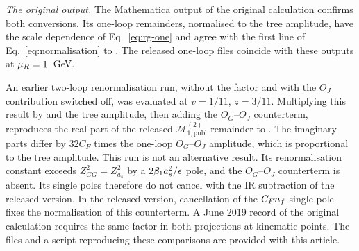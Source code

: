 \emph{The original output.}
The Mathematica output of the original calculation confirms both
conversions.
Its one-loop remainders, normalised to the tree amplitude, have the
scale dependence of Eq.~\eqref{eq:rg-one} and agree with the first
line of Eq.~\eqref{eq:normalisation} to \ArchiveOneLoopDev{}.
The released one-loop files coincide with these outputs at
$\mu_R=1$~GeV.

An earlier two-loop renormalisation run, without the factor
\FileFactor{} and with the $O_J$ contribution switched off,
was evaluated at $v=1/11$, $z=3/11$.
Multiplying this result by \FileFactor{} and the tree amplitude,
then adding the $O_G$--$O_J$ counterterm, reproduces the real part
of the released $\mathcal M_{1,\mathrm{publ}}^{(2)}$ remainder to \ArchiveTwoLoopDev{}.
The imaginary parts differ by $32C_F$ times the one-loop
$O_G$--$O_J$ amplitude, which is proportional to the tree amplitude. This run is not an alternative result.
Its renormalisation constant exceeds $Z_{GG}^2=Z_{a_s}^2$ by a
$2\beta_1a_s^2/\epsilon$ pole, and the $O_G$--$O_J$ counterterm
is absent.
Its single poles therefore do not cancel with the IR subtraction
of the released version.
In the released version, cancellation of the $C_Fn_f$ single pole
fixes the normalisation of this counterterm.
A June 2019 record of the original calculation requires the same
factor in both projections at \RenormPointsWord{} kinematic points.
The files and a script reproducing these comparisons are provided
with this article.
